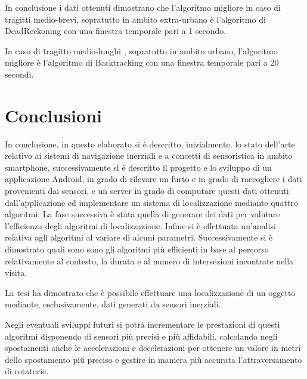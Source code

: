 \documentclass[12pt,a4paper,openright,twoside]{report}
\begin{document}
\medskip
In conclusione i dati ottenuti dimostrano che l'algoritmo migliore in caso di tragitti medio-brevi, sopratutto in ambito extra-urbano è l'algoritmo di DeadReckoning con una finestra temporale pari a 1 secondo. 

In caso di tragitto medio-lunghi , sopratutto in ambito urbano, l'algoritmo migliore è l'algoritmo di Backtracking con una finestra temporale pari a 20 secondi.

\clearpage{\pagestyle{empty}\cleardoublepage}
\chapter*{Conclusioni}

In conclusione, in questo elaborato si è descritto, inizialmente, lo stato dell'arte relativo ai sistemi di navigazione inerziali e a concetti di sensoristica in ambito smartphone, successivamente si è descritto il progetto e lo sviluppo di un applicazione Android, in grado di rilevare un furto e in grado di raccogliere i dati provenienti dai sensori, e un server in grado di computare questi dati ottenuti dall'applicazione ed implementare un sistema di localizzazione mediante quattro algoritmi. La fase successiva è stata quella di generare dei dati per valutare l'efficienza degli algoritmi di localizzazione. Infine si è effettuata un'analisi relativa agli algoritmi al variare di alcuni parametri. Successivamente si è dimostrato quali sono sono gli algoritmi più efficienti in base al percorso relativamente al contesto, la durata e al numero di intersezioni incontrate nella visita.

La tesi ha dimostrato che è possibile effettuare una localizzazione di un oggetto mediante, esclusivamente, dati generati da sensori inerziali. 

Negli eventuali sviluppi futuri si potrà incrementare le prestazioni di questi algoritmi disponendo di sensori più precisi e più affidabili, calcolando negli spostamenti anche le accelerazioni e decelerazioni per ottenere un valore in metri dello spostamento più preciso e gestire in maniera più accurata l'attraversamento di rotatorie.
\end{document}

